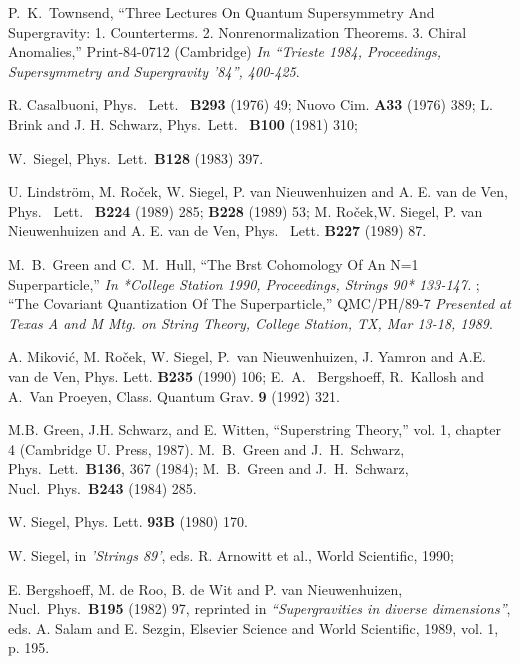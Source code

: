 \documentclass[a4paper,12pt]{article}
\begin{document}
\begin{thebibliography}{999}

   P.~K.~Townsend, ``Three Lectures On Quantum Supersymmetry And
  Supergravity: 1. Counterterms. 2. Nonrenormalization Theorems. 3.
  Chiral Anomalies,'' Print-84-0712 (Cambridge) {\it In ``Trieste 1984,
    Proceedings, Supersymmetry and Supergravity '84'', 400-425}.
  
  
  R. Casalbuoni, Phys. \ Lett. \ {\bf B293}
  (1976) 49; Nuovo Cim. {\bf A33} (1976) 389;
  L. Brink and J. H. Schwarz, Phys.\ Lett.\ {\bf
    B100} (1981) 310;  

   W.~Siegel, 
   Phys.\ Lett.\ {\bf B128} (1983) 397.


  U. Lindstr\"om, M. Ro\v cek, W. Siegel, P. van Nieuwenhuizen and
  A. E. van de Ven, Phys. \ Lett. \ {\bf B224} (1989) 285; {\bf
    B228} (1989) 53; M. Ro\v cek,W. Siegel, P. van Nieuwenhuizen and
  A. E. van de Ven, Phys. \ Lett. {\bf B227} (1989) 87.  

  M.~B.~Green and C.~M.~Hull,
  ``The Brst Cohomology Of An N=1 Superparticle,''
  {\it  In *College Station 1990, Proceedings, Strings 90* 133-147. }; 
  ``The Covariant Quantization Of The Superparticle,'' QMC/PH/89-7 
  {\it Presented at Texas A and M Mtg. on String Theory, College
    Station, TX, Mar 13-18, 1989}. 

  A. Mikovi\'c, M. Ro\v{c}ek, W. Siegel, P.~van Nieuwenhuizen, 
  J. Yamron and A.E. van de Ven, Phys. Lett. {\bf B235} (1990)
  106; E.~A.~ Bergshoeff, R.~Kallosh and A.~Van
  Proeyen, Class. Quantum Grav. {\bf 9} (1992) 321.
 

  M.B. Green, J.H. Schwarz, and E. Witten, ``Superstring Theory,''  
  vol. 1, chapter 4 (Cambridge U. Press, 1987).  M.~B.~Green and
  J.~H.~Schwarz, 
Phys.\ Lett.\ {\bf B136}, 367 (1984); M.~B.~Green and J.~H.~Schwarz,
  Nucl.\ Phys.\ {\bf B243} (1984) 285.

  W. Siegel, Phys. Lett. {\bf 93B} (1980) 170.

 W. Siegel, in {\it 'Strings 89'}, eds. R. Arnowitt et
  al., World Scientific, 1990;

  E. Bergshoeff, M. de Roo, B. de Wit and P. van Nieuwenhuizen,
  Nucl.\ Phys.\ {\bf B195} (1982) 97, reprinted in {\it
    ``Supergravities in diverse dimensions''},  
  eds. A. Salam and E. Sezgin, Elsevier Science and World Scientific,
  1989, vol. 1, p. 195.


\end{thebibliography}
\end{document}
